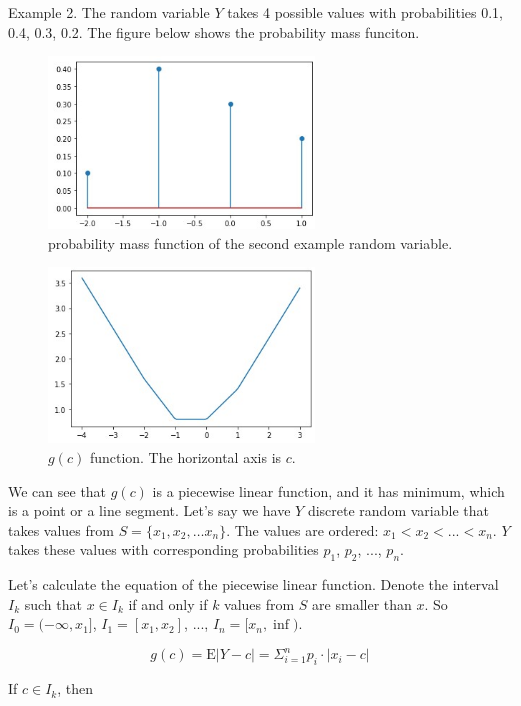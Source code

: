 \documentclass{article}
\begin{document}
Example 2. The random variable $Y$ takes 4 possible values with probabilities 0.1, 0.4, 0.3, 0.2. The figure below shows the probability mass funciton.

\begin{figure}[ht]
 \centering
  \includegraphics[width=200pt]{images/rnd2}
 \caption{probability mass function of the second example random variable.}
\end{figure}

\begin{figure}[ht]
 \centering
  \includegraphics[width=200pt]{images/rnd_func2}
 \caption{$g(c)$ function. The horizontal axis is $c$.}
\end{figure}

We can see that $g(c)$ is a piecewise linear function, and it has minimum, which is a point or a line segment. Let's say we have $Y$ discrete random variable that takes values from $S=\{x_1, x_2, \dots x_n\}$. The values are ordered: $x_1 <  x_2 < ... < x_n$. $Y$ takes these values with corresponding probabilities $p_1$, $p_2$, ..., $p_n$.

Let's calculate the equation of the piecewise linear function. Denote the interval $I_k$ such that $x\in I_k$ if and only if $k$ values from $S$ are smaller than $x$. So $I_0 = (-\infty, x_1]$, $I_1 = [x_1, x_2]$, ..., $I_n = [x_n, \inf)$.

\begin{equation}
    g(c) = \text{E} |Y-c| = \Sigma_{i=1}^{n}p_i \cdot |x_i - c|
\end{equation}

If $c \in I_k$, then
\end{document}
